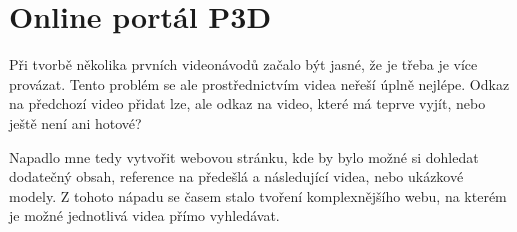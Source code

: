 \chapter{Online portál P3D}
Při tvorbě několika prvních videonávodů začalo být jasné, že je třeba je více provázat.
Tento problém se ale prostřednictvím videa neřeší úplně nejlépe. 
Odkaz na předchozí video přidat lze, ale odkaz na video, které má teprve vyjít, nebo ještě není ani hotové?

Napadlo mne tedy vytvořit webovou stránku, kde by bylo možné si dohledat dodatečný obsah, reference na předešlá a následující videa, nebo ukázkové modely.
Z tohoto nápadu se časem stalo tvoření komplexnějšího webu, na kterém je možné jednotlivá videa přímo vyhledávat.

\newline